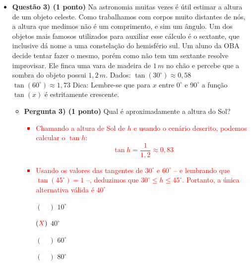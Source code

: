 \documentclass[a4paper, 12pt]{article}
\newcommand{\red}[1]{\textcolor{red}{#1}}
\begin{document}
\begin{flushleft}
\begin{itemize}
            \item \textbf{Questão 3) (1 ponto)} Na astronomia muitas vezes é útil estimar a altura de um objeto celeste. Como trabalhamos com corpos muito distantes de nós, a altura que medimos não é um comprimento, e sim um ângulo. Um dos objetos mais famosos utilizados para auxiliar esse cálculo é o sextante, que inclusive dá nome a uma constelação do hemisfério sul. Um aluno da OBA decide tentar fazer o mesmo, porém como não tem um sextante resolve improvisar. Ele finca uma vara de madeira de $1 \, m$ no chão e percebe que a sombra do objeto possui $1,2 \, m$. \linebreak \linebreak Dados: \linebreak $\tan(30^{\circ}) \approx 0,58$ \linebreak $\tan(60^{\circ}) \approx 1,73$ \linebreak \linebreak Dica: \linebreak Lembre-se que para $x$ entre $0^{\circ}$ e $90^{\circ}$ a função $\tan(x)$ é estritamente crescente.
                \begin{itemize}
                    \item \textbf{Pergunta 3) (1 ponto)} Qual é aproximadamente a altura do Sol?
                        \red{\begin{itemize}
                            \item Chamando a altura de Sol de $h$ e usando o cenário descrito, podemos calcular o $\tan h$:
                                \begin{equation*}
                                    \tan h = \frac{1}{1,2} \approx 0,83
                                \end{equation*}
                            \item Usando os valores das tangentes de $30^{\circ}$ e $60^{\circ}$ -- e lembrando que $\tan (45^{\circ}) = 1$ --, deduzimos que $30^{\circ} \leq h \leq 45^{\circ}$. Portanto, a única alternativa válida é $40^{\circ}$
                        \end{itemize}}
                        \begin{itemize}
                            \item[$(\quad)$] $10^{\circ}$
                            \item[$(\red{X})$] $40^{\circ}$
                            \item[$(\quad)$] $60^{\circ}$
                            \item[$(\quad)$] $80^{\circ}$
                        \end{itemize}
                \end{itemize}


\end{itemize}
\end{flushleft}
\end{document}
